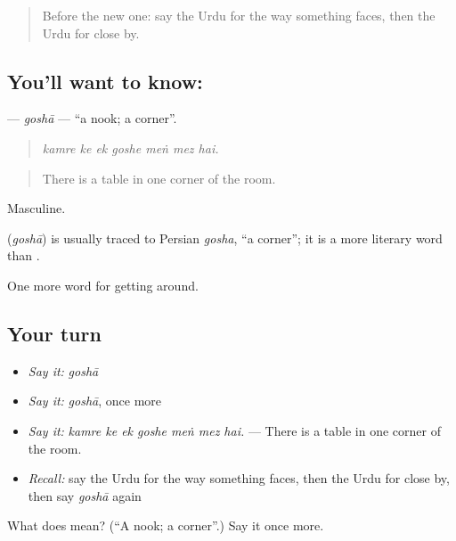 \begin{quote}
Before the new one: say the Urdu for the way something faces, then the Urdu for close by.
\end{quote}

\subsection*{You'll want to know: }
\textbf{} — \emph{goshā} — \textquotedblleft{}a nook; a corner\textquotedblright{}.

\begin{quote}
      
\end{quote}

\begin{quote}
\emph{kamre ke ek goshe meṅ mez hai.}
\end{quote}

\begin{quote}
There is a table in one corner of the room.
\end{quote}

Masculine.

\begin{cousinweb}
\textbf{} (\emph{goshā}) is usually traced to Persian \emph{gosha}, \textquotedblleft{}a corner\textquotedblright{}; it is a more literary word than \textbf{}.
\end{cousinweb}

\begin{grammarlens}[title={What you've built}]
One more word for getting around.
\end{grammarlens}

\subsection*{Your turn}
\begin{itemize}
\raggedright
  \item \emph{Say it:} \emph{goshā}
  \item \emph{Say it:} \emph{goshā}, once more
  \item \emph{Say it:} \emph{kamre ke ek goshe meṅ mez hai.} — There is a table in one corner of the room.
  \item \emph{Recall:} say the Urdu for the way something faces, then the Urdu for close by, then say \emph{goshā} again
\end{itemize}

\begin{tcolorbox}[breakable,colback=teal!4,colframe=teal!35!black,title={Before you move on}]
What does  mean? (\textquotedblleft{}A nook; a corner\textquotedblright{}.) Say it once more.
\end{tcolorbox}

